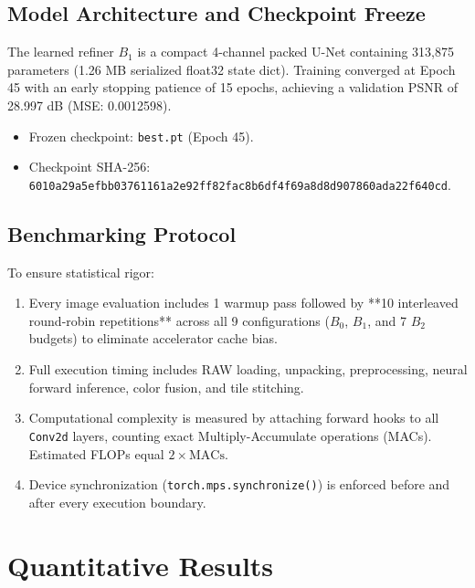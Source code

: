 \documentclass[10pt,twocolumn]{article}
\begin{document}
\subsection{Model Architecture and Checkpoint Freeze}
The learned refiner $B_1$ is a compact 4-channel packed U-Net containing 313,875 parameters (1.26 MB serialized float32 state dict). Training converged at Epoch 45 with an early stopping patience of 15 epochs, achieving a validation PSNR of 28.997 dB (MSE: 0.0012598).
\begin{itemize}
    \item Frozen checkpoint: \texttt{best.pt} (Epoch 45).
    \item Checkpoint SHA-256: \texttt{6010a29a5efbb03761161a2e92ff82fac8b6df4f69a8d8d907860ada22f640cd}.
\end{itemize}

\subsection{Benchmarking Protocol}
To ensure statistical rigor:
\begin{enumerate}
    \item Every image evaluation includes 1 warmup pass followed by **10 interleaved round-robin repetitions** across all 9 configurations ($B_0$, $B_1$, and 7 $B_2$ budgets) to eliminate accelerator cache bias.
    \item Full execution timing includes RAW loading, unpacking, preprocessing, neural forward inference, color fusion, and tile stitching.
    \item Computational complexity is measured by attaching forward hooks to all \texttt{Conv2d} layers, counting exact Multiply-Accumulate operations (MACs). Estimated FLOPs equal $2 \times \text{MACs}$.
    \item Device synchronization (\texttt{torch.mps.synchronize()}) is enforced before and after every execution boundary.
\end{enumerate}

\section{Quantitative Results}
\end{document}

